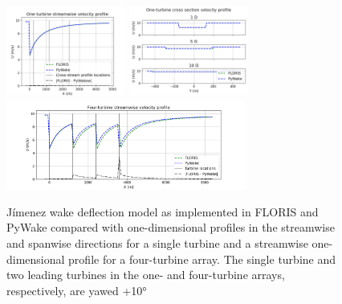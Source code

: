 \documentclass{iopconfser}
\begin{document}
\begin{figure}[]
\centering
\includegraphics[width=0.35\textwidth]{figures/jimenez 1t x.png}
\includegraphics[width=0.35\textwidth]{figures/jimenez 1t y.png}
\\
\includegraphics[width=0.7\textwidth]{figures/jimenez 4t.png}
\caption{Jímenez wake deflection model as implemented in FLORIS and PyWake compared with one-dimensional profiles in the streamwise and spanwise directions for a single turbine and a streamwise one-dimensional profile for a four-turbine array.
The single turbine and two leading turbines in the one- and four-turbine arrays, respectively, are yawed +10°}
\label{fig:jimenez}
\end{figure}
\end{document}
